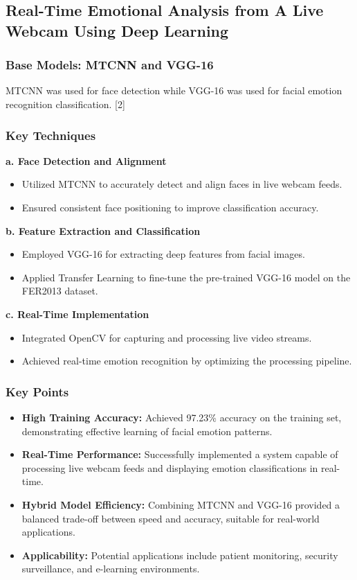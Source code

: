 \documentclass{article}
\begin{document}
\subsection*{Real-Time Emotional Analysis from A Live Webcam Using Deep Learning}

\subsubsection*{Base Models: MTCNN and VGG-16}
MTCNN was used for face detection while VGG-16 was used for facial emotion recognition classification. [2]

\subsubsection*{Key Techniques}
\textbf{a. Face Detection and Alignment}
\begin{itemize}
    \item Utilized MTCNN to accurately detect and align faces in live webcam feeds.
    \item Ensured consistent face positioning to improve classification accuracy.
\end{itemize}

\textbf{b. Feature Extraction and Classification}
\begin{itemize}
    \item Employed VGG-16 for extracting deep features from facial images.
    \item Applied Transfer Learning to fine-tune the pre-trained VGG-16 model on the FER2013 dataset.
\end{itemize}

\textbf{c. Real-Time Implementation}
\begin{itemize}
    \item Integrated OpenCV for capturing and processing live video streams.
    \item Achieved real-time emotion recognition by optimizing the processing pipeline.
\end{itemize}

\subsubsection*{Key Points}
\begin{itemize}
    \item \textbf{High Training Accuracy:} Achieved 97.23\% accuracy on the training set, demonstrating effective learning of facial emotion patterns.
    \item \textbf{Real-Time Performance:} Successfully implemented a system capable of processing live webcam feeds and displaying emotion classifications in real-time.
    \item \textbf{Hybrid Model Efficiency:} Combining MTCNN and VGG-16 provided a balanced trade-off between speed and accuracy, suitable for real-world applications.
    \item \textbf{Applicability:} Potential applications include patient monitoring, security surveillance, and e-learning environments.
\end{itemize}
\end{document}
